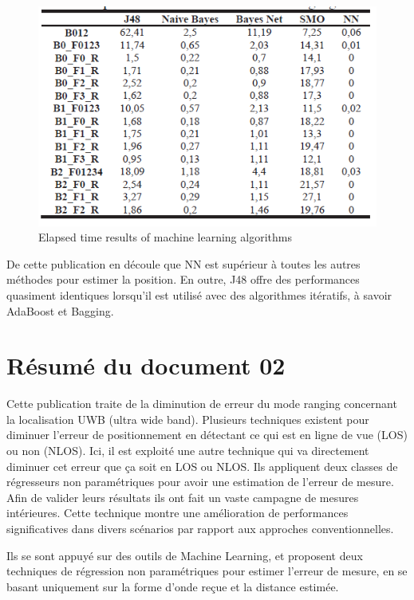 \begin{figure}[H]
	\begin{center}
		\includegraphics[scale=1]{figures/time.png}
		\caption{Elapsed time results of machine learning algorithms}
		\label{fig:time} %
	\end{center}
\end{figure}

De cette publication en découle que NN est supérieur à toutes les autres méthodes pour estimer la position. En outre, J48 offre des performances quasiment identiques lorsqu'il est utilisé avec des algorithmes itératifs, à savoir AdaBoost et Bagging.

\section{Résumé du document 02}
Cette publication traite de la diminution de erreur du mode ranging concernant la localisation UWB (ultra wide band). Plusieurs techniques existent pour diminuer l'erreur de positionnement en détectant ce qui est en ligne de vue (LOS) ou non (NLOS). Ici, il est exploité une autre technique qui va directement diminuer cet erreur que ça soit en LOS ou NLOS. Ils appliquent deux classes de régresseurs non paramétriques pour avoir une estimation de l'erreur de mesure. Afin de valider leurs résultats ils ont fait un vaste campagne de mesures intérieures. Cette technique montre une amélioration de performances significatives dans divers scénarios par rapport aux approches conventionnelles. 

Ils se sont appuyé sur des outils de Machine Learning, et proposent deux techniques de régression non paramétriques pour estimer l’erreur de mesure, en se basant uniquement sur la forme d’onde reçue et la distance estimée.

